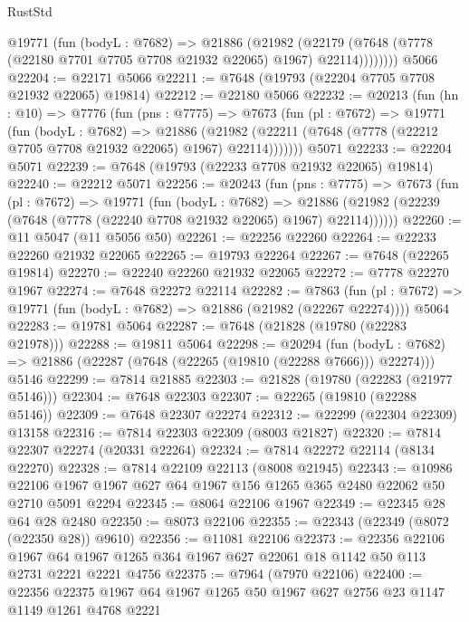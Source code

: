 \begin{lexlean}{RustStd}
\begin{coremodule}
{\begin{coremodule}
{{{{{{{{{{{{{{{{{{{{{{{{{{{{{{{{{{{{{{{{{{{{{{{{{{{{{          @19771
            (fun (bodyL : @7682) =>
            @21886
              (@21982
                (@22179 (@7648 (@7778 (@22180 @7701 @7705 @7708 @21932 @22065) @1967) @22114))))))))
    @5066
@22204 := @22171 @5066
@22211 := @7648 (@19793 (@22204 @7705 @7708 @21932 @22065) @19814)
@22212 := @22180 @5066
@22232 := @20213
    (fun (hn : @10) =>
    @7776
      (fun (pns : @7775) =>
      @7673
        (fun (pl : @7672) =>
        @19771
          (fun (bodyL : @7682) =>
          @21886
            (@21982 (@22211 (@7648 (@7778 (@22212 @7705 @7708 @21932 @22065) @1967) @22114)))))))
    @5071
@22233 := @22204 @5071
@22239 := @7648 (@19793 (@22233 @7708 @21932 @22065) @19814)
@22240 := @22212 @5071
@22256 := @20243
    (fun (pns : @7775) =>
    @7673
      (fun (pl : @7672) =>
      @19771
        (fun (bodyL : @7682) =>
        @21886 (@21982 (@22239 (@7648 (@7778 (@22240 @7708 @21932 @22065) @1967) @22114))))))
@22260 := @11 @5047 (@11 @5056 @50)
@22261 := @22256 @22260
@22264 := @22233 @22260 @21932 @22065
@22265 := @19793 @22264
@22267 := @7648 (@22265 @19814)
@22270 := @22240 @22260 @21932 @22065
@22272 := @7778 @22270 @1967
@22274 := @7648 @22272 @22114
@22282 := @7863
    (fun (pl : @7672) => @19771 (fun (bodyL : @7682) => @21886 (@21982 (@22267 @22274))))
    @5064
@22283 := @19781 @5064
@22287 := @7648 (@21828 (@19780 (@22283 @21978)))
@22288 := @19811 @5064
@22298 := @20294
    (fun (bodyL : @7682) => @21886 (@22287 (@7648 (@22265 (@19810 (@22288 @7666))) @22274)))
    @5146
@22299 := @7814 @21885
@22303 := @21828 (@19780 (@22283 (@21977 @5146)))
@22304 := @7648 @22303
@22307 := @22265 (@19810 (@22288 @5146))
@22309 := @7648 @22307 @22274
@22312 := @22299 (@22304 @22309) @13158
@22316 := @7814 @22303 @22309 (@8003 @21827)
@22320 := @7814 @22307 @22274 (@20331 @22264)
@22324 := @7814 @22272 @22114 (@8134 @22270)
@22328 := @7814 @22109 @22113 (@8008 @21945)
@22343 := @10986
    @22106
    @1967
    @1967
    @627
    @64
    @1967
    @156
    @1265
    @365
    @2480
    @22062
    @50
    @2710
    @5091
    @2294
@22345 := @8064 @22106 @1967
@22349 := @22345 @28 @64 @28 @2480
@22350 := @8073 @22106
@22355 := @22343 (@22349 (@8072 (@22350 @28)) @9610)
@22356 := @11081 @22106
@22373 := @22356
    @22106
    @1967
    @64
    @1967
    @1265
    @364
    @1967
    @627
    @22061
    @18
    @1142
    @50
    @113
    @2731
    @2221
    @2221
    @4756
@22375 := @7964 (@7970 @22106)
@22400 := @22356
    @22375
    @1967
    @64
    @1967
    @1265
    @50
    @1967
    @627
    @2756
    @23
    @1147
    @1149
    @1261
    @4768
    @2221
}}}}}}}}}}}}}}}}}}}}}}}}}}}}}}}}}}}}}}}}}}}}}}}}}}}}}
\end{coremodule}}
\end{coremodule}
\end{lexlean}
